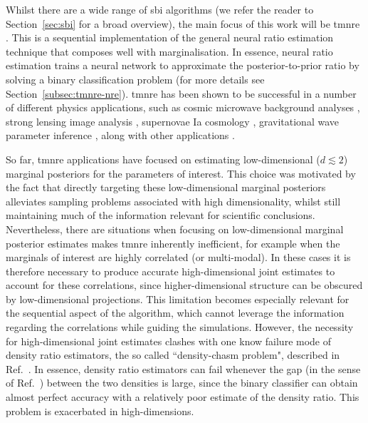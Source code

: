 Whilst there are a wide range of \gls*{sbi} algorithms (we refer the reader to Section~\ref{sec:sbi} for a broad overview), the main focus of this work will be \gls*{tmnre} \cite{Miller:2020hua, Miller:2021aa}. This is a sequential implementation of the general neural ratio estimation technique \cite{Hermans:2019ioj} that composes well with marginalisation. In essence, neural ratio estimation trains a neural network to approximate the posterior-to-prior ratio by solving a binary classification problem (for more details see Section~\ref{subsec:tmnre-nre}).
\Gls*{tmnre} has been shown to be successful in a number of different physics applications, such as cosmic microwave background analyses \cite{Cole:2021gwr}, strong lensing image analysis \cite{Montel:2022fhv, Coogan:2022cky}, supernovae Ia cosmology \cite{Karchev:2022xyn}, gravitational wave parameter inference \cite{Bhardwaj:2023xph, Alvey:2023naa}, along with other applications \cite{Gagnon-Hartman:2023soa, Saxena:2023tue, AnauMontel:2022ppb, Alvey:2023pkx}.

So far, \gls*{tmnre} applications have focused on estimating low-dimensional ($d \lesssim 2$) marginal posteriors for the parameters of interest. This choice was motivated by the fact that directly targeting these low-dimensional marginal posteriors alleviates sampling problems associated with high dimensionality, whilst still maintaining much of the information relevant for scientific conclusions. 
Nevertheless, there are situations when focusing on low-dimensional marginal posterior estimates makes \gls*{tmnre} inherently inefficient, for example when the marginals of interest are highly correlated (or multi-modal). In these cases it is therefore necessary to produce accurate high-dimensional joint estimates to account for these correlations, since higher-dimensional structure can be obscured by low-dimensional projections. This limitation becomes especially relevant for the sequential aspect of the algorithm, which cannot leverage the information regarding the correlations while guiding the simulations. However, the necessity for high-dimensional joint estimates clashes with one know failure mode of density ratio estimators, the so called ``density-chasm problem", described in Ref.~\cite{Rhodes:2020aa}. In essence, density ratio estimators can fail whenever the gap (in the sense of Ref.~\cite{Rhodes:2020aa}) between the two densities is large, since the binary classifier can obtain almost perfect accuracy with a relatively poor estimate of the density ratio. This problem is exacerbated in high-dimensions. 

